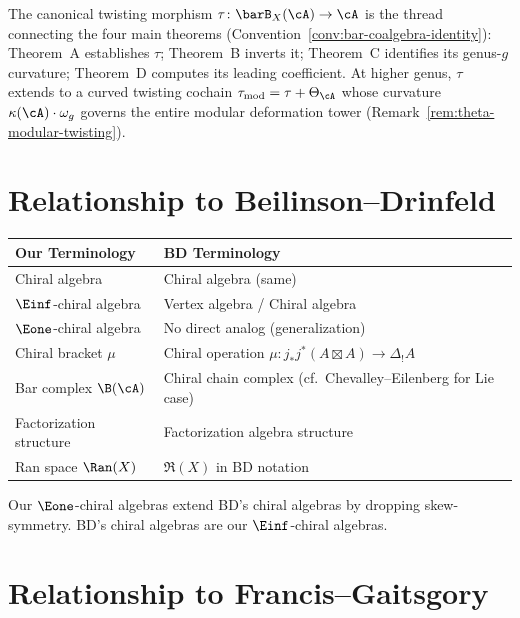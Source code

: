 \begin{remark}
\label{rem:tau-protagonist}
The canonical twisting morphism $\tau \colon \barB_X(\cA) \to \cA$
is the thread connecting the four main theorems
(Convention~\ref{conv:bar-coalgebra-identity}):
Theorem~A establishes $\tau$; Theorem~B inverts it;
Theorem~C identifies its genus-$g$ curvature; Theorem~D computes
its leading coefficient.
At higher genus, $\tau$ extends to a curved twisting cochain
$\tau_{\mathrm{mod}} = \tau + \Theta_\cA$
whose curvature $\kappa(\cA)\cdot\omega_g$ governs the entire
modular deformation tower
(Remark~\ref{rem:theta-modular-twisting}).
\end{remark}

\section{Relationship to Beilinson--Drinfeld}

\begin{tabular}{>{\raggedright\arraybackslash}p{}>{\raggedright\arraybackslash}p{}}
\textbf{Our Terminology} & \textbf{BD Terminology} \\
\hline
Chiral algebra & Chiral algebra (same) \\
$\Einf$-chiral algebra & Vertex algebra / Chiral algebra \\
$\Eone$-chiral algebra & No direct analog (generalization) \\
Chiral bracket $\mu$ & Chiral operation $\mu: j_* j^*(A \boxtimes A) \to \Delta_! A$ \\
Bar complex $\B(\cA)$ & Chiral chain complex (cf.\ Chevalley--Eilenberg for Lie case) \\
Factorization structure & Factorization algebra structure \\
Ran space $\Ran(X)$ & $\mathfrak{R}(X)$ in BD notation \\
\end{tabular}

\begin{remark}
Our $\Eone$-chiral algebras extend BD's chiral algebras by dropping skew-symmetry. BD's chiral algebras are our $\Einf$-chiral algebras.
\end{remark}

\section{Relationship to Francis--Gaitsgory}

